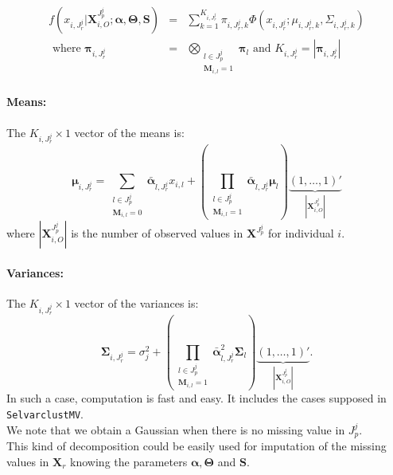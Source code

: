 \documentclass[12pt,a4paper]{report}
\begin{document}
		\begin{eqnarray}
 f(x_{i,J_r^j}|\boldsymbol{X}_{i,O}^{J_p^j};\boldsymbol{\alpha},\boldsymbol{\Theta},\boldsymbol{S})&=& \sum_{k=1}^{K_{i,J_r^j}}\pi_{i,J_r^j,k}\Phi(x_{i,J_r^j};\mu_{i,J_r^j,k},\Sigma_{i,J_r^j,k})  \label{Missingdensity}\\
			\textrm{ where } 	\boldsymbol{\pi}_{i,J_r^j} &=& \bigotimes_{\substack{l \in J_p^j \\ \boldsymbol{M}_{i,l}=1 } } \boldsymbol{\pi}_l \textrm{ and  }K_{i,J_r^j}=|\boldsymbol{\pi}_{i,J_r^j}|  \nonumber 
		\end{eqnarray}	
\paragraph{Means:}	The $ K_{i,J_r^j} \times 1$ vector of the means is:
				\begin{equation}
				\boldsymbol{\mu}_{i,J_r^j}= \sum_{\substack{l \in J_p^j \\ \boldsymbol{M}_{i,l}=0  }}\bar{\boldsymbol{\alpha}}_{l,J_r^j}x_{i,l} + (\prod_{\substack{l \in J_p^j \\ \boldsymbol{M}_{i,l}=1  }} \bar{\boldsymbol{\alpha}}_{l,J_r^j} \boldsymbol{\mu}_l)\underbrace{(1,\dots,1)'}_{|\boldsymbol{X}_{i,O}^{J_p^j}|}  \nonumber 
				\end{equation}
				where $|\boldsymbol{X}_{i,O}^{J_p^j}|$ is the number of observed values in $\boldsymbol{X}^{J_p^j}$ for individual $i$.
\paragraph{Variances:} The $ K_{i,J_r^j} \times 1$ vector of the variances is:
				\begin{equation}
				\boldsymbol{\Sigma}_{i,J_r^j} = \sigma_{j}^2 + (\prod_{\substack{l \in J_p^j \\ \boldsymbol{M}_{i,l}=1 }}\bar{\boldsymbol{\alpha}}_{l,J_r^j}^2 \boldsymbol{\Sigma}_l	)	\underbrace{(1,\dots,1)'}_{|\boldsymbol{X}_{i,O}^{J_p^j}|}. \nonumber 
				\end{equation}
		In such a case, computation is fast and easy. It includes the cases supposed in {\tt SelvarclustMV}.\\
		We note that we obtain a Gaussian when there is no missing value in $J_p^j$.\\
		
		
		This kind of decomposition could be easily used for imputation of the missing values in $\boldsymbol{X}_r$ knowing the parameters $\boldsymbol{\alpha}, \boldsymbol{\Theta}$ and $\boldsymbol{S}$. \\
		
\end{document}
